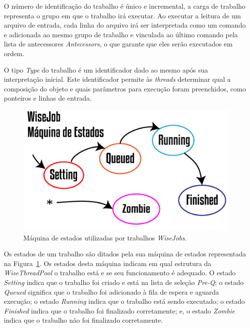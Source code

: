 O número de identificação do trabalho é único e incremental, a carga de trabalho representa o grupo em que o trabalho irá executar. Ao executar a leitura de um arquivo de entrada, cada linha do arquivo irá ser interpretada como um comando e adicionada ao mesmo grupo de trabalho e vinculada ao último comando pela lista de antecessores \textit{Antecessors}, o que garante que eles serão executados em ordem.

O tipo \textit{Type} do trabalho é um identificador dado ao mesmo após sua interpretação inicial. Este identificador permite às \textit{threads} determinar qual a composição do objeto e quais parâmetros para execução foram preenchidos, como ponteiros e linhas de entrada. 

\begin{figure}[!htbp]
	\centering
	\includegraphics[width=\linewidth]{Figures/WiseJobStatus@16x.png}
	\caption{Máquina de estados utilizadas por trabalhos \textit{WiseJobs}.}
	\label{fig9:wise_jobs}
\end{figure}

Os estados de um trabalho são ditados pela sua máquina de estados representada na Figura~\ref{fig9:wise_jobs}. Os estados desta máquina indicam em qual estrutura da \textit{WiseThreadPool} o trabalho está e se seu funcionamento é adequado. O estado \textit{Setting} indica que o trabalho foi criado e está na lista de seleção \textit{Pre-Q}; o estado \textit{Queued} significa que o trabalho foi adicionado à fila de espera e aguarda execução; o estado \textit{Running} indica que o trabalho está sendo executado; o estado \textit{Finished} indica que o trabalho foi finalizado corretamente; e, o estado \textit{Zombie} indica que o trabalho não foi finalizado corretamente. 


